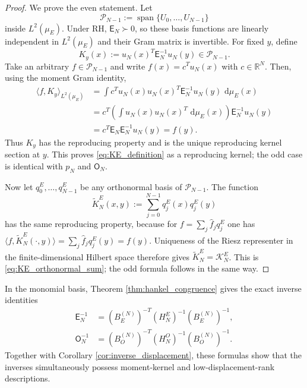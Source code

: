 \documentclass[11pt]{amsart}
\numberwithin{equation}{section}
\theoremstyle{plain}
\theoremstyle{definition}
\theoremstyle{remark}
\newcommand{\RH}{\mathrm{RH}}
\newcommand{\E}{\mathsf E}
\newcommand{\Omat}{\mathsf O}
\newcommand{\dd}{\,\mathrm d}
\begin{document}
\begin{proof}
We prove the even statement.  Let
\begin{equation}
\mathcal P_{N-1}:=\operatorname{span}\{U_0,\ldots,U_{N-1}\}
\end{equation}
inside $L^2(\mu_E)$.  Under $\RH$, $\E_N\succ0$, so these basis functions are linearly independent in $L^2(\mu_E)$ and their Gram matrix is invertible.  For fixed $y$, define
\begin{equation}
K_y(x):=u_N(x)^T\E_N^{-1}u_N(y)\in\mathcal P_{N-1}.
\end{equation}
Take an arbitrary $f\in\mathcal P_{N-1}$ and write $f(x)=c^Tu_N(x)$ with $c\in\mathbb R^N$.  Then, using the moment Gram identity,
\begin{align}
\langle f,K_y\rangle_{L^2(\mu_E)}
&=\int c^Tu_N(x)u_N(x)^T\E_N^{-1}u_N(y)\,\dd\mu_E(x)\\
&=c^T\left(\int u_N(x)u_N(x)^T\,\dd\mu_E(x)\right)\E_N^{-1}u_N(y)\\
&=c^T\E_N\E_N^{-1}u_N(y)=f(y).
\end{align}
Thus $K_y$ has the reproducing property and is the unique reproducing kernel section at $y$.  This proves \eqref{eq:KE_definition} as a reproducing kernel; the odd case is identical with $p_N$ and $\Omat_N$.

Now let $q_0^E,\ldots,q_{N-1}^E$ be any orthonormal basis of $\mathcal P_{N-1}$.  The function
\begin{equation}
\widetilde K_N^E(x,y):=\sum_{j=0}^{N-1}q_j^E(x)q_j^E(y)
\end{equation}
has the same reproducing property, because for
$f=\sum_j\widehat f_jq_j^E$ one has
$\langle f,\widetilde K_N^E(\cdot,y)\rangle=\sum_j\widehat f_jq_j^E(y)=f(y)$.  Uniqueness of the Riesz representer in the finite-dimensional Hilbert space therefore gives
$\widetilde K_N^E=\mathcal K_N^E$.  This is \eqref{eq:KE_orthonormal_sum}; the odd formula follows in the same way.
\end{proof}

In the monomial basis, Theorem \ref{thm:hankel_congruence} gives the exact inverse identities
\begin{align}
\E_N^{-1}
&=(B_E^{(N)})^{-T}(H_N^E)^{-1}(B_E^{(N)})^{-1},
\label{eq:E_inverse_hankel}\\
\Omat_N^{-1}
&=(B_O^{(N)})^{-T}(H_N^O)^{-1}(B_O^{(N)})^{-1}.
\label{eq:O_inverse_hankel}
\end{align}
Together with Corollary \ref{cor:inverse_displacement}, these formulas show that the inverses simultaneously possess moment-kernel and low-displacement-rank descriptions.
\end{document}
